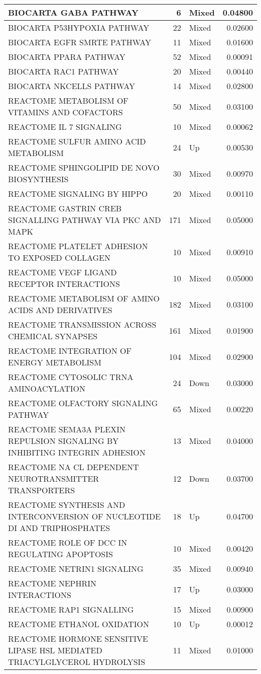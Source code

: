 \documentclass[9pt,a4paper,]{extarticle}
\begin{document}
\begin{table}[t]
{\begin{tabular}{l|r|l|r}
\hline
BIOCARTA GABA PATHWAY & 6 & Mixed & 0.04800\\
\hline
BIOCARTA P53HYPOXIA PATHWAY & 22 & Mixed & 0.02600\\
\hline
BIOCARTA EGFR SMRTE PATHWAY & 11 & Mixed & 0.01600\\
\hline
BIOCARTA PPARA PATHWAY & 52 & Mixed & 0.00091\\
\hline
BIOCARTA RAC1 PATHWAY & 20 & Mixed & 0.00440\\
\hline
BIOCARTA NKCELLS PATHWAY & 14 & Mixed & 0.02800\\
\hline
REACTOME METABOLISM OF VITAMINS AND COFACTORS & 50 & Mixed & 0.03100\\
\hline
REACTOME IL 7 SIGNALING & 10 & Mixed & 0.00062\\
\hline
REACTOME SULFUR AMINO ACID METABOLISM & 24 & Up & 0.00530\\
\hline
REACTOME SPHINGOLIPID DE NOVO BIOSYNTHESIS & 30 & Mixed & 0.00970\\
\hline
REACTOME SIGNALING BY HIPPO & 20 & Mixed & 0.00110\\
\hline
REACTOME GASTRIN CREB SIGNALLING PATHWAY VIA PKC AND MAPK & 171 & Mixed & 0.05000\\
\hline
REACTOME PLATELET ADHESION TO EXPOSED COLLAGEN & 10 & Mixed & 0.00910\\
\hline
REACTOME VEGF LIGAND RECEPTOR INTERACTIONS & 10 & Mixed & 0.05000\\
\hline
REACTOME METABOLISM OF AMINO ACIDS AND DERIVATIVES & 182 & Mixed & 0.03100\\
\hline
REACTOME TRANSMISSION ACROSS CHEMICAL SYNAPSES & 161 & Mixed & 0.01900\\
\hline
REACTOME INTEGRATION OF ENERGY METABOLISM & 104 & Mixed & 0.02900\\
\hline
REACTOME CYTOSOLIC TRNA AMINOACYLATION & 24 & Down & 0.03000\\
\hline
REACTOME OLFACTORY SIGNALING PATHWAY & 65 & Mixed & 0.00220\\
\hline
REACTOME SEMA3A PLEXIN REPULSION SIGNALING BY INHIBITING INTEGRIN ADHESION & 13 & Mixed & 0.04000\\
\hline
REACTOME NA CL DEPENDENT NEUROTRANSMITTER TRANSPORTERS & 12 & Down & 0.03700\\
\hline
REACTOME SYNTHESIS AND INTERCONVERSION OF NUCLEOTIDE DI AND TRIPHOSPHATES & 18 & Up & 0.04700\\
\hline
REACTOME ROLE OF DCC IN REGULATING APOPTOSIS & 10 & Mixed & 0.00420\\
\hline
REACTOME NETRIN1 SIGNALING & 35 & Mixed & 0.00940\\
\hline
REACTOME NEPHRIN INTERACTIONS & 17 & Up & 0.03000\\
\hline
REACTOME RAP1 SIGNALLING & 15 & Mixed & 0.00900\\
\hline
REACTOME ETHANOL OXIDATION & 10 & Up & 0.00012\\
\hline
REACTOME HORMONE SENSITIVE LIPASE HSL MEDIATED TRIACYLGLYCEROL HYDROLYSIS & 11 & Mixed & 0.01000\\
\hline
\end{tabular}}
\end{table}
\end{document}
